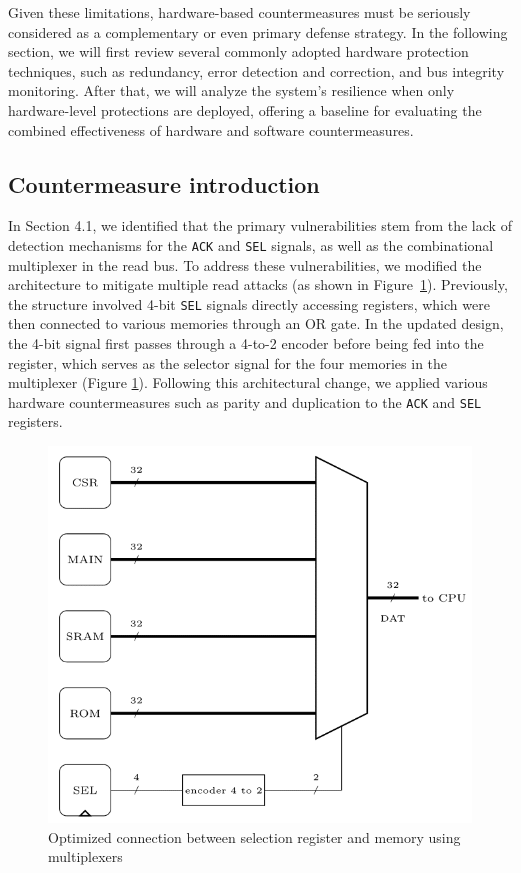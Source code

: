 Given these limitations, hardware-based countermeasures must be seriously considered as a complementary or even primary defense strategy. In the following section, we will first review several commonly adopted hardware protection techniques, such as redundancy, error detection and correction, and bus integrity monitoring. After that, we will analyze the system's resilience when only hardware-level protections are deployed, offering a baseline for evaluating the combined effectiveness of hardware and software countermeasures.

\subsection{Countermeasure introduction}
In Section 4.1, we identified that the primary vulnerabilities stem from the lack of detection mechanisms for the \texttt{ACK} and \texttt{SEL} signals, as well as the combinational multiplexer in the read bus. To address these vulnerabilities, we modified the architecture to mitigate multiple read attacks (as shown in Figure~\ref{change archi}). Previously, the structure involved 4-bit \texttt{SEL} signals directly accessing registers, which were then connected to various memories through an OR gate. In the updated design, the 4-bit signal first passes through a 4-to-2 encoder  before being fed into the register, which serves as the selector signal for the four memories in the multiplexer (Figure \ref{change archi}). Following this architectural change, we applied various hardware countermeasures such as parity and duplication to the \texttt{ACK} and \texttt{SEL} registers. 

\begin{figure}[t!]
  \centering
  \includegraphics[width=0.9\linewidth]{Chapitre4/figures/change arch.png}
  \caption{Optimized connection between selection register and memory using multiplexers}
  \label{change archi}
\end{figure}

